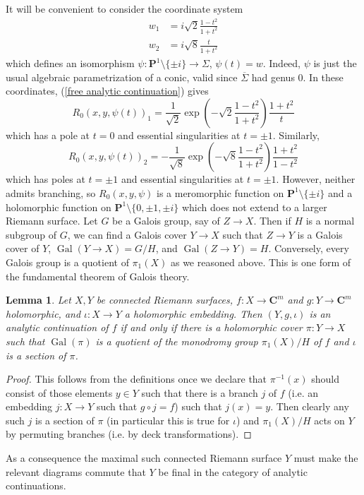 \documentclass[reqno,12pt,letterpaper]{amsart}
\newcommand{\CC}{\mathbf{C}}
\newcommand{\PP}{\mathbf P}
\DeclareMathOperator{\Gal}{Gal}
\newtheorem{lemma}[theorem]{Lemma}
\theoremstyle{definition}
\begin{document}
It will be convenient to consider the coordinate system
\begin{align*}
w_1 &= i\sqrt 2 \frac{1 - t^2}{1 + t^2}\\
w_2 &= i\sqrt 8 \frac{t}{1 + t^2}
\end{align*}
which defines an isomorphism $\psi: \PP^1 \setminus \{\pm i\} \to \Sigma$, $\psi(t) = w$.
Indeed, $\psi$ is just the usual algebraic parametrization of a conic, valid since $\overline \Sigma$ had genus $0$.
In these coordinates, (\ref{free analytic continuation}) gives
$$
R_0(x, y, \psi(t))_1 = \frac{1}{\sqrt 2} \exp\left(-\sqrt 2\frac{1 - t^2}{1 + t^2}\right) \frac{1 + t^2}{t}
$$
which has a pole at $t = 0$ and essential singularities at $t = \pm 1$. Similarly,
$$R_0(x, y, \psi(t))_2 = -\frac{1}{\sqrt 8} \exp\left(-\sqrt 8 \frac{1 - t^2}{1 + t^2}\right) \frac{1 + t^2}{1 - t^2}$$
which has poles at $t = \pm 1$ and essential singularities at $t = \pm 1$.
However, neither admits branching, so $R_0(x, y, \psi)$ is a meromorphic function on $\PP^1 \setminus \{\pm i\}$ and a holomorphic function on $\PP^1 \setminus \{0, \pm 1, \pm i\}$ which does not extend to a larger Riemann surface.
Let $G$ be a Galois group, say of $Z \to X$. Then if $H$ is a normal subgroup of $G$, we can find a Galois cover $Y \to X$ such that $Z \to Y$ is a Galois cover of $Y$, $\Gal(Y \to X) = G/H$, and $\Gal(Z \to Y) = H$.
Conversely, every Galois group is a quotient of $\pi_1(X)$ as we reasoned above.
This is one form of the fundamental theorem of Galois theory.

\begin{lemma}
Let $X,Y$ be connected Riemann surfaces, $f: X \to \CC^m$ and $g: Y \to \CC^m$ holomorphic, and $\iota: X \to Y$ a holomorphic embedding.
Then $(Y, g, \iota)$ is an analytic continuation of $f$ if and only if there is a holomorphic cover $\pi: Y \to X$ such that $\Gal(\pi)$ is a quotient of the monodromy group $\pi_1(X)/H$ of $f$ and $\iota$ is a section of $\pi$.
\end{lemma}
\begin{proof}
This follows from the definitions once we declare that $\pi^{-1}(x)$ should consist of those elements $y \in Y$ such that there is a branch $j$ of $f$ (i.e. an embedding $j: X \to Y$ such that $g \circ j = f$) such that $j(x) = y$.
Then clearly any such $j$ is a section of $\pi$ (in particular this is true for $\iota$) and $\pi_1(X)/H$ acts on $Y$ by permuting branches (i.e. by deck transformations).
\end{proof}
As a consequence the maximal such connected Riemann surface $Y$ must make the relevant diagrams commute that $Y$ be final in the category of analytic continuations.
\end{document}
